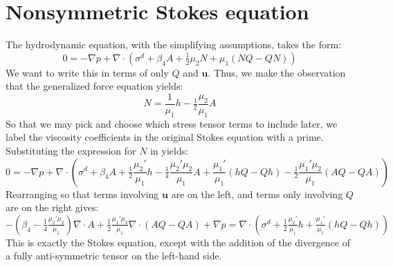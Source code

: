 \documentclass[reqno]{article}
\begin{document}
\section{Nonsymmetric Stokes equation} \label{nonsymmetric-stokes-equation}
The hydrodynamic equation, with the simplifying assumptions, takes the form:
\begin{equation}
  0
  =
  - \nabla p
  +
  \nabla \cdot
  \left(
    \sigma^d
    + \beta_4 A
    + \tfrac12 \mu_2 N
    + \mu_1 \left(
      NQ - QN
    \right)
  \right)
\end{equation}
We want to write this in terms of only $Q$ and $\mathbf{u}$.
Thus, we make the observation that the generalized force equation yields:
\begin{equation}
  N
  =
  \frac{1}{\mu_1} h
  - \tfrac12 \frac{\mu_2}{\mu_1} A
\end{equation}
So that we may pick and choose which stress tensor terms to include later, we
label the viscosity coefficients in the original Stokes equation with a prime.
Substituting the expression for $N$ in yields:
\begin{equation}
  0
  =
  - \nabla p
  +
  \nabla \cdot
  \left(
    \sigma^d
    + \beta_4 A
    + \tfrac12 \frac{\mu_2'}{\mu_1} h
    - \tfrac14 \frac{\mu_2' \mu_2}{\mu_1} A
    + \frac{\mu_1'}{\mu_1} \left(
      hQ - Qh
    \right)
    - \tfrac12 \frac{\mu_1' \mu_2}{\mu_1} \left(
      AQ - QA
    \right)
  \right)
\end{equation}
Rearranging so that terms involving $\mathbf{u}$ are on the left, and terms only
involving $Q$ are on the right gives:
\begin{equation} \label{eq:nonsymmetric-stokes-equation}
  -\left( \beta_4 - \tfrac14 \tfrac{\mu_2' \mu_2}{\mu_1} \right) \nabla \cdot A
  + \tfrac12 \tfrac{\mu_1' \mu_2}{\mu_1} \nabla \cdot \left(
    AQ - QA
  \right)
  + \nabla p
  =
  \nabla \cdot \left(
    \sigma^d
    + \tfrac12 \tfrac{\mu_2'}{\mu_1} h
    + \tfrac{\mu_1'}{\mu_1} \left(
      hQ - Qh
    \right)
  \right)
\end{equation}
This is exactly the Stokes equation, except with the addition of the divergence
of a fully anti-symmetric tensor on the left-hand side.
\end{document}
